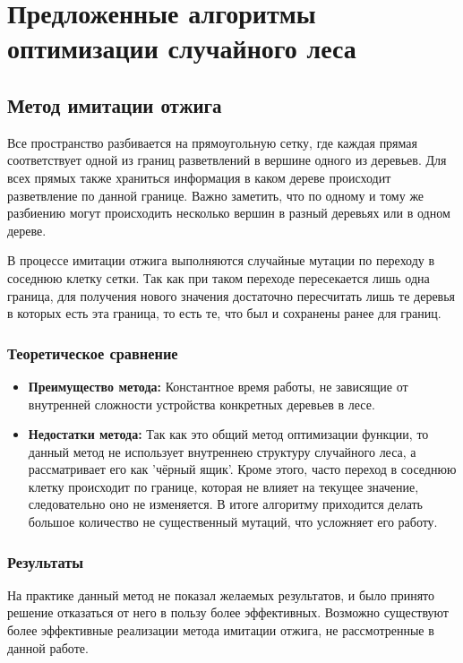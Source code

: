 \chapter{Предложенные алгоритмы оптимизации случайного леса}

\section{Метод имитации отжига}

Все пространство разбивается на прямоугольную сетку, где каждая прямая
соответствует одной из границ разветвлений в вершине одного из деревьев. Для
всех прямых также храниться информация в каком дереве происходит разветвление по
данной границе. Важно заметить, что по одному и тому же разбиению могут
происходить несколько вершин в разный деревьях или в одном дереве.

В процессе имитации отжига выполняются случайные мутации по переходу в соседнюю клетку сетки.
Так как при таком переходе пересекается лишь одна граница, для получения нового
значения достаточно пересчитать лишь те деревья в которых есть эта граница, то
есть те, что был и сохранены ранее для границ.

\subsection{Теоретическое сравнение}

\begin{itemize}
    \item \textbf{Преимущество метода:} Константное время работы, не
    зависящие от внутренней сложности устройства конкретных деревьев в лесе.
    \item \textbf{Недостатки метода:} Так как это общий метод оптимизации функции, то
    данный метод не использует внутреннею структуру случайного леса,
    а рассматривает его как 'чёрный ящик'. Кроме этого, часто переход в соседнюю
    клетку происходит по границе, которая не влияет на текущее значение,
    следовательно оно не изменяется. В итоге алгоритму приходится делать большое
    количество не существенный мутаций, что усложняет его работу.
\end{itemize}

\subsection{Результаты}
На практике данный метод не показал желаемых результатов, и было принято решение
отказаться от него в пользу более эффективных. Возможно существуют более эффективные
реализации метода имитации отжига, не рассмотренные в данной работе.


